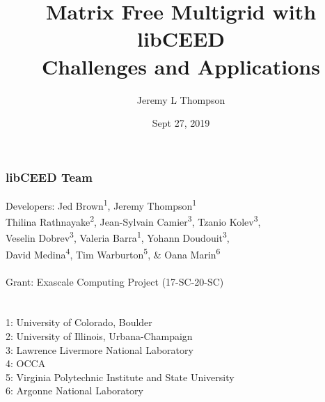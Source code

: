 \documentclass{beamer}
\title[libCEED Finite Element Library]{Matrix Free Multigrid with libCEED\\Challenges and Applications} %
\author[Jeremy L Thompson]{Jeremy L Thompson} %
\institute[CU Boulder] %
{University of Colorado Boulder \\ %
\medskip
\textit{jeremy.thompson@colorado.edu} %
}
\date{Sept 27, 2019} %
\begin{document}
\begin{frame}
\titlepage %
\end{frame}


\begin{frame}
\begin{center}
\frametitle{libCEED Team}

{\flushleft

Developers: \hspace{2mm} Jed Brown\textsuperscript{1}, Jeremy Thompson\textsuperscript{1} \\
\hspace{23mm}  Thilina Rathnayake\textsuperscript{2}, Jean-Sylvain Camier\textsuperscript{3}, Tzanio Kolev\textsuperscript{3},\\
\hspace{23mm} Veselin Dobrev\textsuperscript{3}, Valeria Barra\textsuperscript{1}, Yohann Doudouit\textsuperscript{3},\\
\hspace{23mm} David Medina\textsuperscript{4}, Tim Warburton\textsuperscript{5}, \& Oana Marin\textsuperscript{6}\\

~\\

Grant: \hspace{11mm} Exascale Computing Project (17-SC-20-SC)\\

~\\

~\\

\small{1: University of Colorado, Boulder\\
2: University of Illinois, Urbana-Champaign\\
3: Lawrence Livermore National Laboratory\\
4: OCCA\\
5: Virginia Polytechnic Institute and State University\\
6: Argonne National Laboratory\\}}

\end{center}
\end{frame}
\end{document}
